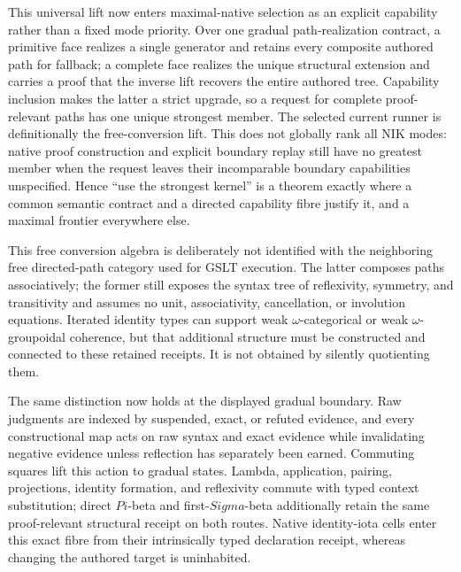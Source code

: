 \documentclass[11pt]{article}
\begin{document}
This universal lift now enters maximal-native selection as an explicit
capability rather than a fixed mode priority.  Over one gradual path-realization
contract, a primitive face realizes a single generator and retains every
composite authored path for fallback; a complete face realizes the unique
structural extension and carries a proof that the inverse lift recovers the
entire authored tree.  Capability inclusion makes the latter a strict upgrade,
so a request for complete proof-relevant paths has one unique strongest member.
The selected current runner is definitionally the free-conversion lift.  This
does not globally rank all NIK modes: native proof construction and explicit
boundary replay still have no greatest member when the request leaves their
incomparable boundary capabilities unspecified.  Hence ``use the strongest
kernel'' is a theorem exactly where a common semantic contract and a directed
capability fibre justify it, and a maximal frontier everywhere else.

This free conversion algebra is deliberately not identified with the neighboring
free directed-path category used for GSLT execution.  The latter composes paths
associatively; the former still exposes the syntax tree of reflexivity,
symmetry, and transitivity and assumes no unit, associativity, cancellation, or
involution equations.  Iterated identity types can support weak
$\omega$-categorical or weak $\omega$-groupoidal coherence, but that additional
structure must be constructed and connected to these retained receipts.  It is
not obtained by silently quotienting them.

The same distinction now holds at the displayed gradual boundary.  Raw
judgments are indexed by suspended, exact, or refuted evidence, and every
constructional map acts on raw syntax and exact evidence while invalidating
negative evidence unless reflection has separately been earned.  Commuting
squares lift this action to gradual states.  Lambda, application, pairing,
projections, identity formation, and reflexivity commute with typed context
substitution; direct $Pi$-beta and first-$Sigma$-beta additionally retain the
same proof-relevant structural receipt on both routes.  Native identity-iota
cells enter this exact fibre from their intrinsically typed declaration receipt,
whereas changing the authored target is uninhabited.
\end{document}
